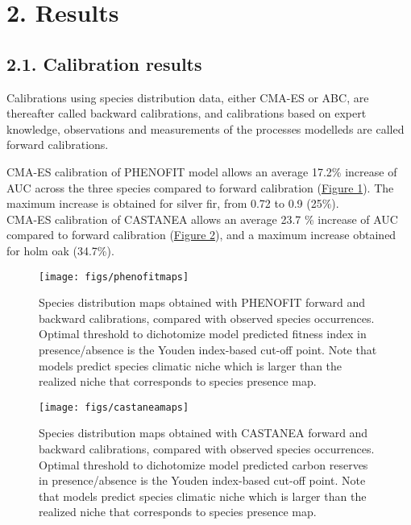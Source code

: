 \documentclass[11pt,]{article}
\begin{document}
\hypertarget{results}{%
\section{2. Results}\label{results}}

\hypertarget{calibration-results}{%
\subsection{2.1. Calibration results}\label{calibration-results}}

Calibrations using species distribution data, either CMA-ES or ABC, are
thereafter called backward calibrations, and calibrations based on
expert knowledge, observations and measurements of the processes
modelleds are called forward calibrations.

CMA-ES calibration of PHENOFIT model allows an average 17.2\% increase
of AUC across the three species compared to forward calibration
(\hyperref[fig:phenofitmaps]{Figure 1}). The maximum increase is
obtained for silver fir, from 0.72 to 0.9 (25\%).\\
CMA-ES calibration of CASTANEA allows an average 23.7 \% increase of AUC
compared to forward calibration (\hyperref[fig:castaneamaps]{Figure 2}),
and a maximum increase obtained for holm oak (34.7\%).

\begin{figure}[H]

{\centering \texttt{[image: figs/phenofitmaps]} 

}

\caption{Species distribution maps obtained with PHENOFIT forward and backward calibrations, compared with observed species occurrences. Optimal threshold to dichotomize model predicted fitness index in presence/absence is the Youden index-based cut-off point. Note that models predict species climatic niche which is larger than the realized niche that corresponds to species presence map.}\label{fig:phenofitmaps}
\end{figure}

\begin{figure}[H]

{\centering \texttt{[image: figs/castaneamaps]} 

}

\caption{Species distribution maps obtained with CASTANEA forward and backward calibrations, compared with observed species occurrences. Optimal threshold to dichotomize model predicted carbon reserves in presence/absence is the Youden index-based cut-off point. Note that models predict species climatic niche which is larger than the realized niche that corresponds to species presence map.}\label{fig:castaneamaps}
\end{figure}
\end{document}
